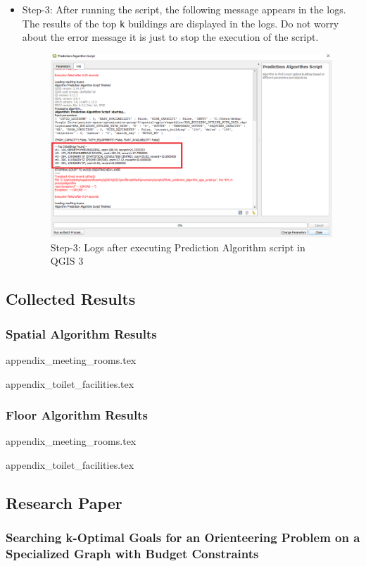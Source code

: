 \begin{itemize}
\item Step-3: After running the script, the following message appears in the logs. The results of the top \texttt{k} buildings are displayed in the logs. Do not worry about the error message it is just to stop the execution of the script.

\begin{figure}[H]
\centering
\includegraphics[width=12cm,keepaspectratio=true]{resources/p3.PNG}
\caption{Step-3: Logs after executing Prediction Algorithm script in QGIS 3}
\label{fig:p3}
\end{figure}
\end{itemize}

\subsection{Collected Results}

\subsubsection{Spatial Algorithm Results}
{appendix_meeting_rooms.tex}

{appendix_toilet_facilities.tex}

\subsubsection{Floor Algorithm Results}
{appendix_meeting_rooms.tex}

{appendix_toilet_facilities.tex}

\subsection{Research Paper} \label{rpaper}

\subsubsection{Searching k-Optimal Goals for an Orienteering Problem on a Specialized Graph with Budget Constraints}

